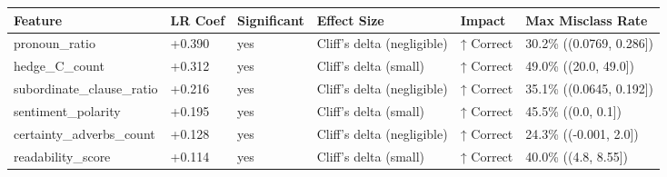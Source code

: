 \begin{tabular}{llllll}
\toprule
Feature & LR Coef & Significant & Effect Size & Impact & Max Misclass Rate \\
\midrule
pronoun\_ratio & +0.390 & yes & Cliff's delta (negligible) & ↑ Correct & 30.2\% ((0.0769, 0.286]) \\
hedge\_C\_count & +0.312 & yes & Cliff's delta (small) & ↑ Correct & 49.0\% ((20.0, 49.0]) \\
subordinate\_clause\_ratio & +0.216 & yes & Cliff's delta (negligible) & ↑ Correct & 35.1\% ((0.0645, 0.192]) \\
sentiment\_polarity & +0.195 & yes & Cliff's delta (small) & ↑ Correct & 45.5\% ((0.0, 0.1]) \\
certainty\_adverbs\_count & +0.128 & yes & Cliff's delta (negligible) & ↑ Correct & 24.3\% ((-0.001, 2.0]) \\
readability\_score & +0.114 & yes & Cliff's delta (small) & ↑ Correct & 40.0\% ((4.8, 8.55]) \\
\bottomrule
\end{tabular}
